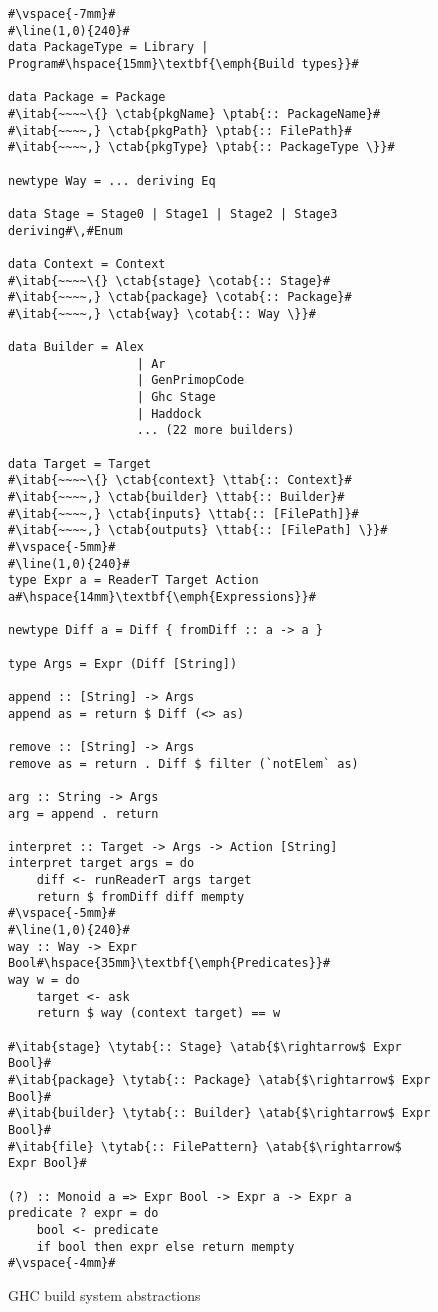 \begin{figure}
\begin{lstlisting}
#\vspace{-7mm}#
#\line(1,0){240}#
data PackageType = Library | Program#\hspace{15mm}\textbf{\emph{Build types}}#

data Package = Package
#\itab{~~~~\{} \ctab{pkgName} \ptab{:: PackageName}#
#\itab{~~~~,} \ctab{pkgPath} \ptab{:: FilePath}#
#\itab{~~~~,} \ctab{pkgType} \ptab{:: PackageType \}}#

newtype Way = ... deriving Eq

data Stage = Stage0 | Stage1 | Stage2 | Stage3 deriving#\,#Enum

data Context = Context
#\itab{~~~~\{} \ctab{stage} \cotab{:: Stage}#
#\itab{~~~~,} \ctab{package} \cotab{:: Package}#
#\itab{~~~~,} \ctab{way} \cotab{:: Way \}}#

data Builder = Alex
                  | Ar
                  | GenPrimopCode
                  | Ghc Stage
                  | Haddock
                  ... (22 more builders)

data Target = Target
#\itab{~~~~\{} \ctab{context} \ttab{:: Context}#
#\itab{~~~~,} \ctab{builder} \ttab{:: Builder}#
#\itab{~~~~,} \ctab{inputs} \ttab{:: [FilePath]}#
#\itab{~~~~,} \ctab{outputs} \ttab{:: [FilePath] \}}#
#\vspace{-5mm}#
#\line(1,0){240}#
type Expr a = ReaderT Target Action a#\hspace{14mm}\textbf{\emph{Expressions}}#

newtype Diff a = Diff { fromDiff :: a -> a }

type Args = Expr (Diff [String])

append :: [String] -> Args
append as = return $ Diff (<> as)

remove :: [String] -> Args
remove as = return . Diff $ filter (`notElem` as)

arg :: String -> Args
arg = append . return

interpret :: Target -> Args -> Action [String]
interpret target args = do
    diff <- runReaderT args target
    return $ fromDiff diff mempty
#\vspace{-5mm}#
#\line(1,0){240}#
way :: Way -> Expr Bool#\hspace{35mm}\textbf{\emph{Predicates}}#
way w = do
    target <- ask
    return $ way (context target) == w

#\itab{stage} \tytab{:: Stage} \atab{$\rightarrow$ Expr Bool}#
#\itab{package} \tytab{:: Package} \atab{$\rightarrow$ Expr Bool}#
#\itab{builder} \tytab{:: Builder} \atab{$\rightarrow$ Expr Bool}#
#\itab{file} \tytab{:: FilePattern} \atab{$\rightarrow$ Expr Bool}#

(?) :: Monoid a => Expr Bool -> Expr a -> Expr a
predicate ? expr = do
    bool <- predicate
    if bool then expr else return mempty
#\vspace{-4mm}#
\end{lstlisting}
\caption{GHC build system abstractions\label{fig:abstractions}}
\end{figure}

